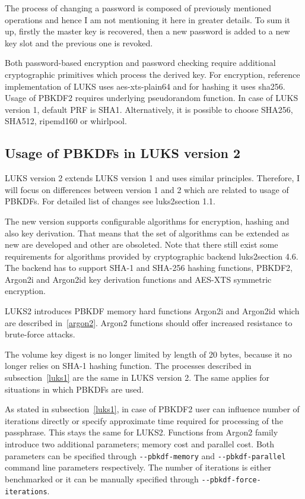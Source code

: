 \documentclass[nolof]{fithesis3}
\begin{document}
The process of changing a password is composed of previously mentioned operations and hence I am not mentioning it here in greater details. To sum it up, firstly the master key is recovered, then a new password is added to a new key slot and the previous one is revoked.

Both password-based encryption and password checking require additional cryptographic primitives which process the derived key. For encryption, reference implementation of LUKS uses aes-xts-plain64 and for hashing it uses sha256. Usage of PBKDF2 requires underlying pseudorandom function. In case of LUKS version 1, default PRF is SHA1. Alternatively, it is possible to choose SHA256, SHA512, ripemd160 or whirlpool.

\subsection{Usage of PBKDFs in LUKS version 2}
\label{luks2pbkdf}
LUKS version 2 extends LUKS version 1 and uses similar principles. Therefore, I will focus on differences between version 1 and 2 which are related to usage of PBKDFs. For detailed list of changes see \parencite{}{luks2}{section 1.1}.

The new version supports configurable algorithms for encryption, hashing and also key derivation. That means that the set of algorithms can be extended as new are developed and other are obsoleted. Note that there still exist some requirements for algorithms provided by cryptographic backend \parencite{}{luks2}{section 4.6}. The backend has to support SHA-1 and SHA-256 hashing functions, PBKDF2, Argon2i and Argon2id key derivation functions and AES-XTS symmetric encryption.

LUKS2 introduces PBKDF memory hard functions Argon2i and Argon2id which are described in~\ref{argon2}. Argon2 functions should offer increased resistance to brute-force attacks.

The volume key digest is no longer limited by length of 20 bytes, because it no longer relies on SHA-1 hashing function. The processes described in subsection~\ref{luks1} are the same in LUKS version 2. The same applies for situations in which PBKDFs are used. 

As stated in subsection~\ref{luks1},  in case of PBKDF2 user can influence number of iterations directly or specify approximate time required for processing of the passphrase. This stays the same for LUKS2. Functions from Argon2 family introduce two additional parameters; memory cost and parallel cost. Both parameters can be specified through \verb+--pbkdf-memory+ and \verb+--pbkdf-parallel+ command line parameters respectively. The number of iterations is either benchmarked or it can be manually specified through \verb+--pbkdf-force-iterations+.
\end{document}
